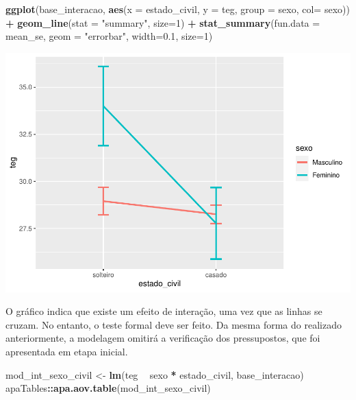 \documentclass[
]{book}
\newenvironment{Shaded}{\begin{snugshade}}{\end{snugshade}}
\newcommand{\DataTypeTok}[1]{\textcolor[rgb]{0.13,0.29,0.53}{#1}}
\newcommand{\DecValTok}[1]{\textcolor[rgb]{0.00,0.00,0.81}{#1}}
\newcommand{\FloatTok}[1]{\textcolor[rgb]{0.00,0.00,0.81}{#1}}
\newcommand{\KeywordTok}[1]{\textcolor[rgb]{0.13,0.29,0.53}{\textbf{#1}}}
\newcommand{\NormalTok}[1]{#1}
\newcommand{\OperatorTok}[1]{\textcolor[rgb]{0.81,0.36,0.00}{\textbf{#1}}}
\newcommand{\StringTok}[1]{\textcolor[rgb]{0.31,0.60,0.02}{#1}}
\begin{document}
\begin{Shaded}
\begin{Highlighting}[]
\KeywordTok{ggplot}\NormalTok{(base_interacao, }\KeywordTok{aes}\NormalTok{(}\DataTypeTok{x =}\NormalTok{ estado_civil, }\DataTypeTok{y =}\NormalTok{ teg, }\DataTypeTok{group =}\NormalTok{ sexo, }\DataTypeTok{col=}\NormalTok{ sexo)) }\OperatorTok{+}
\StringTok{  }\KeywordTok{geom_line}\NormalTok{(}\DataTypeTok{stat =} \StringTok{"summary"}\NormalTok{, }\DataTypeTok{size=}\DecValTok{1}\NormalTok{) }\OperatorTok{+}\StringTok{ }
\StringTok{  }\KeywordTok{stat_summary}\NormalTok{(}\DataTypeTok{fun.data =}\NormalTok{ mean_se, }\DataTypeTok{geom =} \StringTok{"errorbar"}\NormalTok{, }\DataTypeTok{width=}\FloatTok{0.1}\NormalTok{, }\DataTypeTok{size=}\DecValTok{1}\NormalTok{)}
\end{Highlighting}
\end{Shaded}

\begin{center}\includegraphics{gitbook-demo_files/figure-latex/unnamed-chunk-71-1} \end{center}

O gráfico indica que existe um efeito de interação, uma vez que as linhas se cruzam. No entanto, o teste formal deve ser feito. Da mesma forma do realizado anteriormente, a modelagem omitirá a verificação dos pressupostos, que foi apresentada em etapa inicial.

\begin{Shaded}
\begin{Highlighting}[]
\NormalTok{mod_int_sexo_civil <-}\StringTok{ }\KeywordTok{lm}\NormalTok{(teg }\OperatorTok{~}\StringTok{ }\NormalTok{sexo }\OperatorTok{*}\StringTok{ }\NormalTok{estado_civil, base_interacao)}
\NormalTok{apaTables}\OperatorTok{::}\KeywordTok{apa.aov.table}\NormalTok{(mod_int_sexo_civil)}
\end{Highlighting}
\end{Shaded}
\end{document}

